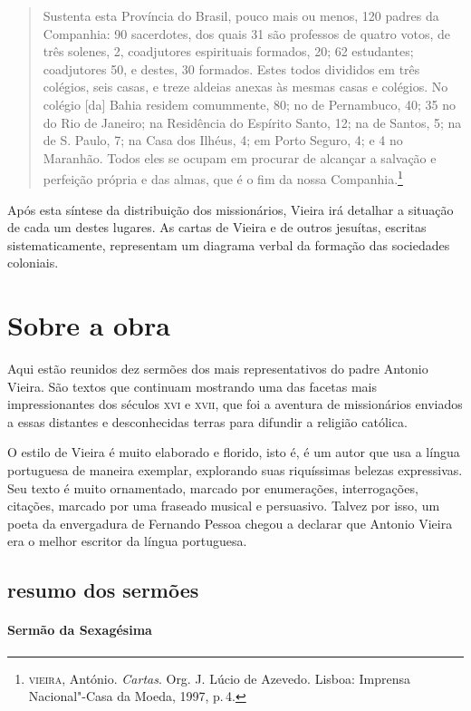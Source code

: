 \begin{quote}
Sustenta esta Província do Brasil, pouco mais ou menos, 120 padres da
Companhia: 90 sacerdotes, dos quais 31 são professos de quatro votos, de
três solenes, 2, coadjutores espirituais formados, 20; 62 estudantes;
coadjutores 50, e destes, 30 formados. Estes todos divididos em três
colégios, seis casas, e treze aldeias anexas às mesmas casas e colégios.
No colégio {[}da{]} Bahia residem comummente, 80; no de Pernambuco, 40;
35 no do Rio de Janeiro; na Residência do Espírito Santo, 12; na de
Santos, 5; na de S. Paulo, 7; na Casa dos Ilhéus, 4; em Porto Seguro, 4;
e 4 no Maranhão. Todos eles se ocupam em procurar de alcançar a salvação
e perfeição própria e das almas, que é o fim da nossa
Companhia.\footnote{\textsc{vieira}, António. \textit{Cartas}. Org. J. Lúcio de Azevedo.
  Lisboa: Imprensa Nacional"-Casa da Moeda, 1997, p.\,4.}
\end{quote}

Após esta síntese da distribuição dos missionários, Vieira irá detalhar
a situação de cada um destes lugares. As cartas de Vieira e de outros
jesuítas, escritas sistematicamente, representam um diagrama verbal da
formação das sociedades coloniais.

\section{Sobre a obra}

Aqui estão reunidos dez sermões dos mais representativos do padre Antonio Vieira.
São textos que continuam mostrando uma das facetas mais impressionantes dos
séculos \textsc{xvi} e \textsc{xvii}, que foi a aventura de missionários enviados a essas
distantes e desconhecidas terras para difundir a religião católica.

O estilo de Vieira é muito elaborado e florido, isto é, é um autor que
usa a língua portuguesa de maneira exemplar, explorando suas riquíssimas
belezas expressivas. Seu texto é muito ornamentado, marcado por
enumerações, interrogações, citações, marcado por uma fraseado musical e
persuasivo. Talvez por isso, um poeta da envergadura de Fernando Pessoa chegou a declarar que Antonio Vieira era o melhor escritor da língua portuguesa.

\subsection{resumo dos sermões}

\paragraph{Sermão da Sexagésima}

